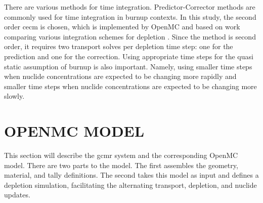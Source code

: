 \documentclass[letterpaper]{physor2024}
\begin{document}
There are various methods for time integration. Predictor-Corrector methods are commonly used for time integration in burnup contexts. In this study, the second order \gls{cecm} is chosen, which is implemented by OpenMC and based on work comparing various integration schemes for depletion \cite{isotalo_comparison_2015}. Since the method is second order, it requires two transport solves per depletion time step: one for the prediction and one for the correction. Using appropriate time steps for the quasi static assumption of burnup is also important. Namely, using smaller time steps when nuclide concentrations are expected to be changing more rapidly and smaller time steps when nuclide concentrations are expected to be changing more slowly.

\section{OPENMC MODEL}\label{sec:openmc_model}
This section will describe the \gls{gcmr} system and the corresponding OpenMC model. There are two parts to the model. The first assembles the geometry, material, and tally definitions. The second takes this model as input and defines a depletion simulation, facilitating the alternating transport, depletion, and nuclide updates.
\end{document}
